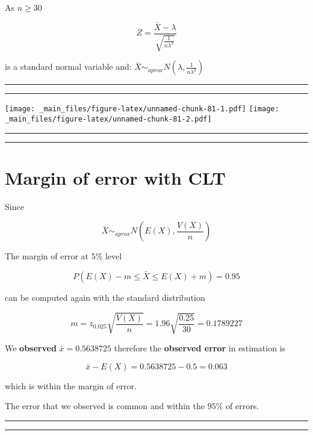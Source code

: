 \documentclass[
]{book}
\begin{document}
As \(n \geq 30\)

\[Z=\frac{\bar{X}-\lambda}{\sqrt{\frac{1}{n\lambda^2}}}\]

is a standard normal variable and: \(\bar{X} \sim_{aprox} N(\lambda, \frac{1}{n\lambda^2})\)

\begin{center}\rule{0.5\linewidth}{0.5pt}\end{center}

\begin{center}\rule{0.5\linewidth}{0.5pt}\end{center}

\texttt{[image: \_main\_files/figure-latex/unnamed-chunk-81-1.pdf]} \texttt{[image: \_main\_files/figure-latex/unnamed-chunk-81-2.pdf]}

\begin{center}\rule{0.5\linewidth}{0.5pt}\end{center}

\begin{center}\rule{0.5\linewidth}{0.5pt}\end{center}

\hypertarget{margin-of-error-with-clt}{%
\section{Margin of error with CLT}\label{margin-of-error-with-clt}}

Since

\[\bar{X} \sim_{aprox}  N(E(X), \frac{V(X)}{n})\]

The margin of error at \(5\%\) level

\[P(E(X)-m \leq \bar{X} \leq E(X) + m)=0.95\]

can be computed again with the standard distribution

\[m=z_{0.025} \sqrt{\frac{V(X)}{n}}=1.96\sqrt{\frac{0.25}{30}}=0.1789227\]

We \textbf{observed} \(\bar{x}=0.5638725\) therefore the \textbf{observed error} in estimation is

\[\bar{x} - E(X)=0.5638725-0.5=0.063\]

which is within the margin of error.

The error that we observed is common and within the \(95\%\) of errors.

\begin{center}\rule{0.5\linewidth}{0.5pt}\end{center}

\begin{center}\rule{0.5\linewidth}{0.5pt}\end{center}
\end{document}
